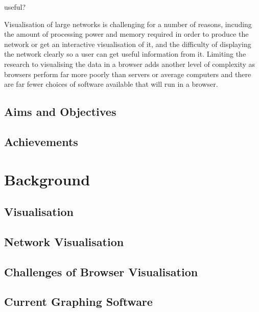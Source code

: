 \documentclass{l4proj}
\begin{document}
useful? 

Visualisation of large networks is challenging for a number of reasons, incuding the amount of processing power and memory required in order to produce the network or get an interactive visualisation of it, and the difficulty of displaying the network clearly so a user can get useful information from it. Limiting the research to visualising the data in a browser adds another level of complexity as browsers perform far more poorly than servers or average computers and there are far fewer choices of software available that will run in a browser.

\section{Aims and Objectives}



\section{Achievements}





\chapter{Background}

\section{Visualisation}

\section{Network Visualisation}

\section{Challenges of Browser Visualisation}

\section{Current Graphing Software}
\end{document}
